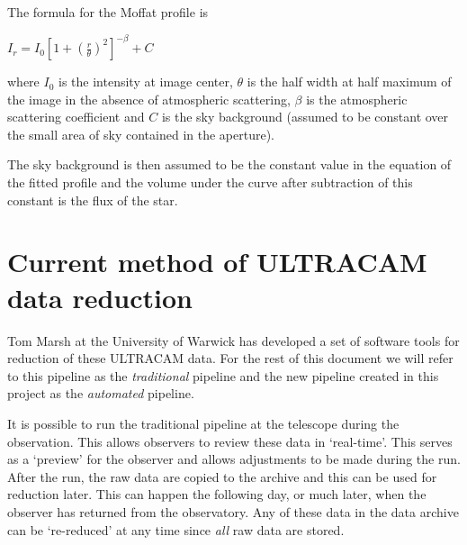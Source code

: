 The formula for the Moffat profile is 

$ I_r = I_0 {[1 + {(\frac{r}{\theta})}^2]}^{-\beta} + C$

where $I_0$ is the intensity at image center, $\theta$ is the half width at half maximum of the image in the absence of atmospheric scattering, $\beta$ is the atmospheric scattering coefficient and $C$ is the sky background (assumed to be constant over the small area of sky contained in the aperture). 

The sky background is then assumed to be the constant value in the equation of the fitted profile and the volume under the curve after subtraction of this constant is the flux of the star. 

\section{Current method of ULTRACAM data reduction}
Tom Marsh at the University of Warwick has developed a set of software tools for reduction of these ULTRACAM data. For the rest of this document we will refer to this pipeline as the \emph{traditional} pipeline and the new pipeline created in this project as the \emph{automated} pipeline. 

It is possible to run the traditional pipeline at the telescope during the observation. This allows observers to review these data in `real-time'. This serves as a `preview' for the observer and allows adjustments to be made during the run. After the run, the raw data are copied to the archive and this can be used for reduction later. This can happen the following day, or much later, when the observer has returned from the observatory. Any of these data in the data archive can be `re-reduced' at any time since \emph{all} raw data are stored. 

